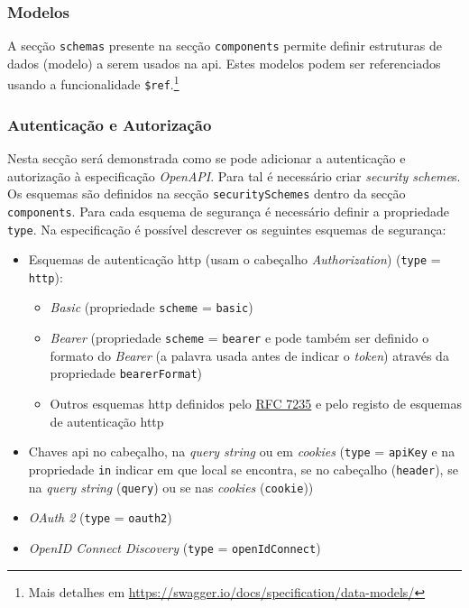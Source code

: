 \subsubsection{Modelos}
A secção \texttt{schemas} presente na secção \texttt{components} permite definir estruturas de dados (modelo) a serem usados na \acrshort{api}. Estes modelos podem ser referenciados usando a funcionalidade \texttt{\$ref}.\footnote{Mais detalhes em \url{https://swagger.io/docs/specification/data-models/}}

\subsubsection{Autenticação e Autorização}\label{sec:authSwagger}
Nesta secção será demonstrada como se pode adicionar a autenticação e autorização à especificação \textit{OpenAPI}. Para tal é necessário criar \textit{security scheme}s. Os esquemas são definidos na secção \texttt{securitySchemes} dentro da secção \texttt{components}. Para cada esquema de segurança é necessário definir a propriedade \texttt{type}. Na especificação é possível descrever os seguintes esquemas de segurança:
\begin{itemize}
    \item Esquemas de autenticação \acrshort{http} (usam o cabeçalho \textit{Authorization}) (\texttt{type} = \texttt{http}):
    \begin{itemize}
        \item \textit{Basic} (propriedade \texttt{scheme} = \texttt{basic})
        \item \textit{Bearer} (propriedade \texttt{scheme} = \texttt{bearer} e pode também ser definido o formato do \textit{Bearer} (a palavra usada antes de indicar o \textit{token}) através da propriedade \texttt{bearerFormat})
        \item Outros esquemas \acrshort{http} definidos pelo \href{https://tools.ietf.org/html/rfc7235}{RFC 7235} e pelo registo de esquemas de autenticação \acrshort{http}
    \end{itemize}
    \item Chaves \acrshort{api} no cabeçalho, na \textit{query string} ou em \textit{cookies} (\texttt{type} = \texttt{apiKey} e na propriedade \texttt{in} indicar em que local se encontra, se no cabeçalho (\texttt{header}), se na \textit{query string} (\texttt{query}) ou se nas \textit{cookies} (\texttt{cookie}))
    \item \textit{OAuth 2} (\texttt{type} = \texttt{oauth2})
    \item \textit{OpenID Connect Discovery} (\texttt{type} = \texttt{openIdConnect})
\end{itemize}

